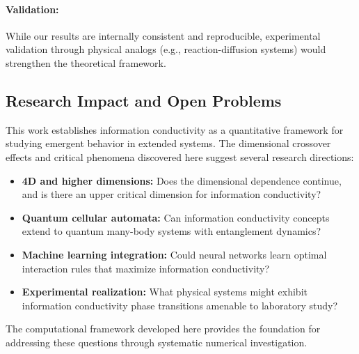 \paragraph{Validation:} While our results are internally consistent and 
reproducible, experimental validation through physical analogs 
(e.g., reaction-diffusion systems) would strengthen the theoretical 
framework.

\subsection{Research Impact and Open Problems}

This work establishes information conductivity as a quantitative framework 
for studying emergent behavior in extended systems. The dimensional crossover 
effects and critical phenomena discovered here suggest several research 
directions:

\begin{itemize}
\item \textbf{4D and higher dimensions:} Does the dimensional dependence continue, 
and is there an upper critical dimension for information conductivity?

\item \textbf{Quantum cellular automata:} Can information conductivity concepts 
extend to quantum many-body systems with entanglement dynamics?

\item \textbf{Machine learning integration:} Could neural networks learn 
optimal interaction rules that maximize information conductivity?

\item \textbf{Experimental realization:} What physical systems might exhibit 
information conductivity phase transitions amenable to laboratory study?
\end{itemize}

The computational framework developed here provides the foundation for 
addressing these questions through systematic numerical investigation.

